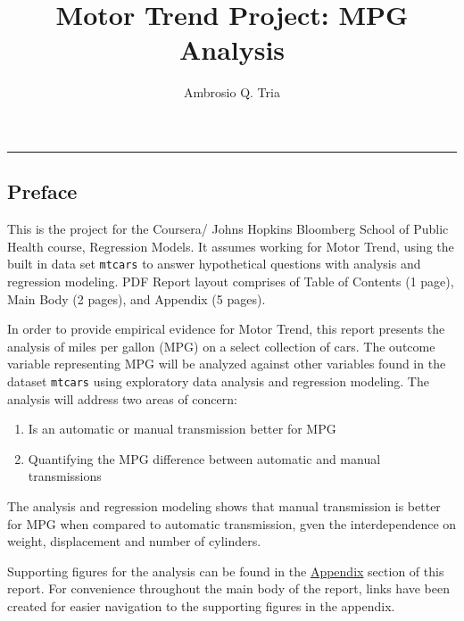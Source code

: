 \documentclass[10pt,]{article}
\title{Motor Trend Project: MPG Analysis}
\author{Ambrosio Q. Tria}
\date{}
\begin{document}
\maketitle


{
\hypersetup{linkcolor=black}
\setcounter{tocdepth}{2}
\tableofcontents
}
\begin{center}\rule{0.5\linewidth}{\linethickness}\end{center}

\newpage

\subsection{Preface}\label{preface}

This is the project for the Coursera/ Johns Hopkins Bloomberg School of
Public Health course, Regression Models. It assumes working for Motor
Trend, using the built in data set \texttt{mtcars} to answer
hypothetical questions with analysis and regression modeling. PDF Report
layout comprises of Table of Contents (1 page), Main Body (2 pages), and
Appendix (5 pages).


In order to provide empirical evidence for Motor Trend, this report
presents the analysis of miles per gallon (MPG) on a select collection
of cars. The outcome variable representing MPG will be analyzed against
other variables found in the dataset \texttt{mtcars} using exploratory
data analysis and regression modeling. The analysis will address two
areas of concern:

\begin{enumerate}
\def\labelenumi{\arabic{enumi}.}
\itemsep1pt\parskip0pt
\item
  Is an automatic or manual transmission better for MPG
\item
  Quantifying the MPG difference between automatic and manual
  transmissions
\end{enumerate}

The analysis and regression modeling shows that manual transmission is
better for MPG when compared to automatic transmission, gven the
interdependence on weight, displacement and number of cylinders.

Supporting figures for the analysis can be found in the
\hyperref[appendix]{Appendix} section of this report. For convenience
throughout the main body of the report, links have been created for
easier navigation to the supporting figures in the appendix.
\end{document}
